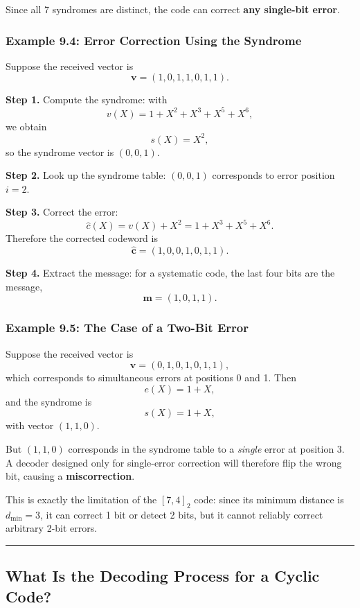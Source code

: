 \documentclass[
]{article}
\begin{document}
Since all 7 syndromes are distinct, the code can correct \textbf{any
single-bit error}.

\subsubsection{Example 9.4: Error Correction Using the
Syndrome}\label{example-9.4-error-correction-using-the-syndrome}

Suppose the received vector is \[\mathbf{v}=(1,0,1,1,0,1,1).\]

\textbf{Step 1.} Compute the syndrome: with \[v(X)=1+X^2+X^3+X^5+X^6,\]
we obtain \[s(X)=X^2,\] so the syndrome vector is \((0,0,1)\).

\textbf{Step 2.} Look up the syndrome table: \((0,0,1)\) corresponds to
error position \(i=2\).

\textbf{Step 3.} Correct the error:
\[\hat{c}(X)=v(X)+X^2 = 1+X^3+X^5+X^6.\] Therefore the corrected
codeword is \[\hat{\mathbf{c}}=(1,0,0,1,0,1,1).\]

\textbf{Step 4.} Extract the message: for a systematic code, the last
four bits are the message, \[\mathbf{m}=(1,0,1,1).\]

\subsubsection{Example 9.5: The Case of a Two-Bit
Error}\label{example-9.5-the-case-of-a-two-bit-error}

Suppose the received vector is \[\mathbf{v}=(0,1,0,1,0,1,1),\] which
corresponds to simultaneous errors at positions 0 and 1. Then
\[e(X)=1+X,\] and the syndrome is \[s(X)=1+X,\] with vector \((1,1,0)\).

But \((1,1,0)\) corresponds in the syndrome table to a \emph{single}
error at position 3. A decoder designed only for single-error correction
will therefore flip the wrong bit, causing a \textbf{miscorrection}.

This is exactly the limitation of the \([7,4]_2\) code: since its
minimum distance is \(d_{\min}=3\), it can correct 1 bit or detect 2
bits, but it cannot reliably correct arbitrary 2-bit errors.

\begin{center}\rule{0.5\linewidth}{0.5pt}\end{center}

\subsection{What Is the Decoding Process for a Cyclic
Code?}\label{what-is-the-decoding-process-for-a-cyclic-code}
\end{document}
